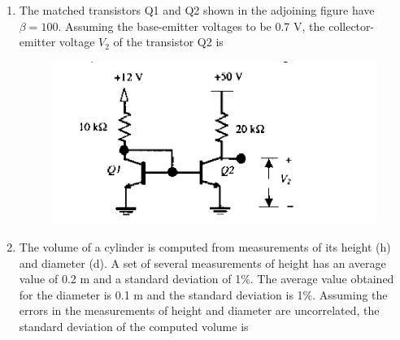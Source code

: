 \documentclass[journal,12pt,onecolumn]{IEEEtran}
\theoremstyle{remark}
\begin{document}
\begin{enumerate}
\vspace{0.5cm}

\item The matched transistors Q1 and Q2 shown in the adjoining figure have $\beta = 100$. Assuming the base-emitter voltages to be 0.7 V, the collector-emitter voltage $V_2$ of the transistor Q2 is
\begin{figure}[h]
    \centering
    \includegraphics[scale=0.75]{q33}
    \caption*{}
    \label{fig:placeholder}
\end{figure}
\hfill{}\begin{enumerate}  \end{enumerate}

\item The volume of a cylinder is computed from measurements of its height (h) and diameter (d). A set of several measurements of height has an average value of 0.2 m and a standard deviation of 1\%. The average value obtained for the diameter is 0.1 m and the standard deviation is 1\%. Assuming the errors in the measurements of height and diameter are uncorrelated, the standard deviation of the computed volume is
\hfill{}\begin{enumerate}  \end{enumerate}


\end{enumerate}
\end{document}
